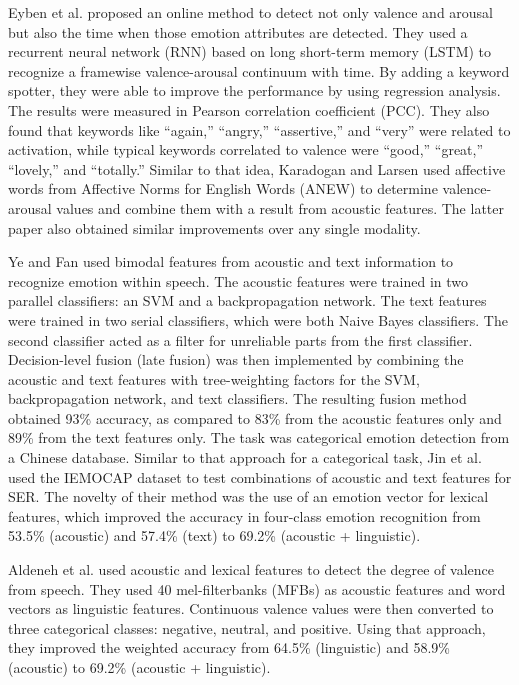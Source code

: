 Eyben et al. \cite{Eyben2010} proposed an online method to detect not only
valence and arousal but also the time when those emotion attributes are
detected. They used a recurrent neural network (RNN) based on long short-term
memory (LSTM) to recognize a framewise valence-arousal continuum with time. By
adding a keyword spotter, they were able to improve the performance by using
regression analysis. The results were measured in Pearson correlation
coefficient (PCC).  They also found that keywords like ``again,'' ``angry,''
``assertive,'' and ``very'' were related to activation, while typical keywords
correlated to valence were ``good,'' ``great,'' ``lovely,'' and ``totally.''
Similar to that idea, Karadogan and Larsen \cite{Karadogan2012} used affective
words from Affective Norms for English Words (ANEW) to determine
valence-arousal values and combine them with a result from acoustic features.
The latter paper also obtained similar improvements over any single
modality.

Ye and Fan \cite{Ye2014} used bimodal features from acoustic and text
information to recognize emotion within speech. The acoustic features were
trained in two parallel classifiers: an SVM and a backpropagation network. The
text features were trained in two serial classifiers, which were both Naive
Bayes classifiers.  The second classifier acted as a filter for unreliable
parts from the first classifier. Decision-level fusion (late fusion) was then
implemented by combining the acoustic and text features with tree-weighting
factors for the SVM, backpropagation network, and text classifiers. The
resulting fusion method obtained 93\% accuracy, as compared to 83\% from the
acoustic features only and 89\% from the text features only. The task was
categorical emotion detection from a Chinese database. Similar to that approach
for a categorical task, Jin et al. \cite{Jin2015} used the IEMOCAP dataset to
test combinations of acoustic and text features for SER. The novelty of their
method was the use of an emotion vector for lexical features, which improved
the accuracy in four-class emotion recognition from 53.5\% (acoustic) and
57.4\% (text) to 69.2\% (acoustic + linguistic).

Aldeneh et al. \cite{Aldeneh2017} used acoustic and lexical features to detect
the degree of valence from speech. They used 40 mel-filterbanks (MFBs) as
acoustic features and word vectors as linguistic features. Continuous valence
values were then converted to three categorical classes: negative, neutral, and
positive. Using that approach, they improved the weighted accuracy from 64.5\%
(linguistic) and 58.9\% (acoustic) to 69.2\% (acoustic + linguistic). 

